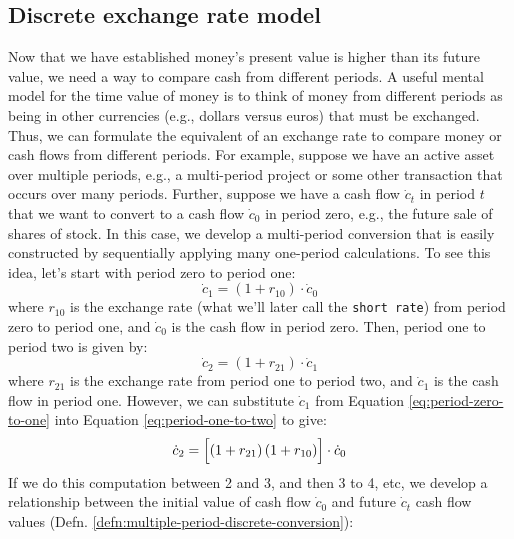 \documentclass[11pt]{article}
\theoremstyle{definition}
\begin{document}
\subsection{Discrete exchange rate model}
Now that we have established money’s present value is higher than its future value, we need a way to compare cash from different periods. 
A useful mental model for the time value of money is to think of money from different periods 
as being in other currencies (e.g., dollars versus euros) that must be exchanged. 
Thus, we can formulate the equivalent of an exchange rate to compare money or cash flows from different periods. 
For example, suppose we have an active asset over multiple periods, e.g., a multi-period project or some other transaction that occurs over many periods. 
Further, suppose we have a cash flow $\dot{c}_{t}$ in period $t$ that we want to convert to a cash flow $\dot{c}_{0}$ in period zero, e.g., the future sale of shares of stock.
In this case, we develop a multi-period conversion that is easily constructed by sequentially applying many one-period calculations. To see this idea, let's start with period zero to period one:
\begin{equation}\label{eq:period-zero-to-one}
\dot{c}_{1} = \left(1+r_{10}\right)\cdot\dot{c}_{0}
\end{equation}
where $r_{10}$ is the exchange rate (what we'll later call the \texttt{short rate}) from period zero to period one, and $\dot{c}_{0}$ is the cash flow in period zero.
Then, period one to period two is given by:
\begin{equation}\label{eq:period-one-to-two}
\dot{c}_{2} = \left(1+r_{21}\right)\cdot\dot{c}_{1}
\end{equation}
where $r_{21}$ is the exchange rate from period one to period two, and $\dot{c}_{1}$ is the cash flow in period one. 
However, we can substitute $\dot{c}_{1}$ from Equation \ref{eq:period-zero-to-one} into Equation \ref{eq:period-one-to-two} to give:
\begin{equation}\label{eq:period-one-to-two-substituted}
\dot{c}_{2} = \Bigl[\left(1+r_{21}\right)\left(1+r_{10}\right)\Bigr]\cdot\dot{c}_{0}
\end{equation}
If we do this computation between 2 and 3, and then 3 to 4, etc, we develop a relationship between the initial value of cash flow 
$\dot{c}_{0}$ and future $\dot{c}_{t}$ cash flow values (Defn. \ref{defn:multiple-period-discrete-conversion}):
\end{document}
